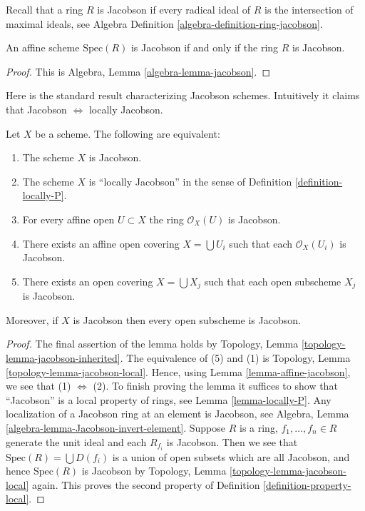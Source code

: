\noindent
Recall that a ring $R$ is Jacobson if every radical ideal of $R$
is the intersection of maximal ideals, see Algebra Definition
\ref{algebra-definition-ring-jacobson}.

\begin{lemma}
\label{lemma-affine-jacobson}
An affine scheme $\text{Spec}(R)$ is Jacobson if and only if
the ring $R$ is Jacobson.
\end{lemma}

\begin{proof}
This is Algebra, Lemma \ref{algebra-lemma-jacobson}.
\end{proof}

\noindent
Here is the standard result characterizing Jacobson schemes.
Intuitively it claims that Jacobson $\Leftrightarrow$ locally Jacobson.

\begin{lemma}
\label{lemma-locally-jacobson}
Let $X$ be a scheme. The following are equivalent:
\begin{enumerate}
\item The scheme $X$ is Jacobson.
\item The scheme $X$ is ``locally Jacobson'' in the sense of
Definition \ref{definition-locally-P}.
\item For every affine open $U \subset X$ the ring $\mathcal{O}_X(U)$
is Jacobson.
\item There exists an affine open covering $X = \bigcup U_i$ such that
each $\mathcal{O}_X(U_i)$ is Jacobson.
\item There exists an open covering $X = \bigcup X_j$
such that each open subscheme $X_j$ is Jacobson.
\end{enumerate}
Moreover, if $X$ is Jacobson then every open subscheme
is Jacobson.
\end{lemma}

\begin{proof}
The final assertion of the lemma holds by
Topology, Lemma \ref{topology-lemma-jacobson-inherited}.
The equivalence of (5) and (1) is
Topology, Lemma \ref{topology-lemma-jacobson-local}.
Hence, using Lemma \ref{lemma-affine-jacobson},
we see that (1) $\Leftrightarrow$ (2).
To finish proving the lemma it suffices to show that ``Jacobson''
is a local property of rings, see Lemma \ref{lemma-locally-P}.
Any localization of a Jacobson ring at an element is Jacobson, see
Algebra, Lemma \ref{algebra-lemma-Jacobson-invert-element}.
Suppose $R$ is a ring, $f_1, \ldots, f_n \in R$ generate the unit
ideal and each $R_{f_i}$ is Jacobson. Then we see that
$\text{Spec}(R) = \bigcup D(f_i)$ is a union of open subsets
which are all Jacobson, and hence $\text{Spec}(R)$ is Jacobson
by Topology, Lemma \ref{topology-lemma-jacobson-local} again.
This proves the second property of Definition \ref{definition-property-local}.
\end{proof}

